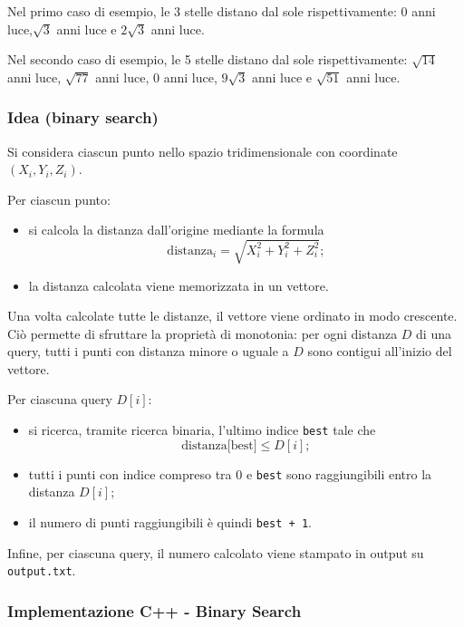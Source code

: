Nel primo caso di esempio, le 3 stelle distano dal sole rispettivamente: $0$ anni luce,$\sqrt{3}$ anni luce e $2\sqrt{3}$ anni luce.
\bigskip

Nel secondo caso di esempio, le 5 stelle distano dal sole rispettivamente: $\sqrt{14}$ anni luce, $\sqrt{77}$ anni luce, $0$ anni luce, $9\sqrt{3}$ anni luce e $\sqrt{51}$ anni luce.


\subsubsection*{Idea (binary search)}

Si considera ciascun punto nello spazio tridimensionale con coordinate $(X_i, Y_i, Z_i)$.

Per ciascun punto:
\begin{itemize}
	\item si calcola la distanza dall'origine mediante la formula
	\[
	\text{distanza}_i = \sqrt{X_i^2 + Y_i^2 + Z_i^2};
	\]
	\item la distanza calcolata viene memorizzata in un vettore.
\end{itemize}

Una volta calcolate tutte le distanze, il vettore viene ordinato in modo crescente.  
Ciò permette di sfruttare la proprietà di monotonia: per ogni distanza \(D\) di una query, tutti i punti con distanza minore o uguale a \(D\) sono contigui all'inizio del vettore.

Per ciascuna query \(D[i]\):
\begin{itemize}
	\item si ricerca, tramite ricerca binaria, l'ultimo indice \texttt{best} tale che
	\[
	\text{distanza[best]} \le D[i];
	\]
	\item tutti i punti con indice compreso tra $0$ e \texttt{best} sono raggiungibili entro la distanza $D[i]$;
	\item il numero di punti raggiungibili è quindi \texttt{best + 1}.
\end{itemize}

Infine, per ciascuna query, il numero calcolato viene stampato in output su \texttt{output.txt}.


\subsubsection*{Implementazione C++ - Binary Search}


